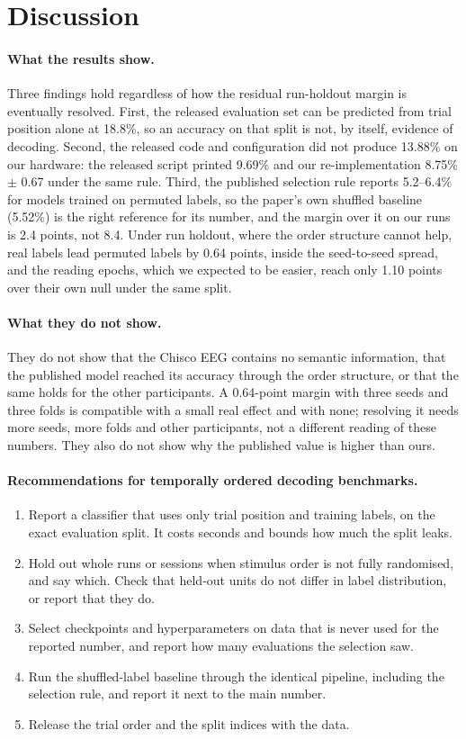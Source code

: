 \section{Discussion}
\label{sec:discussion}

\paragraph{What the results show.}
Three findings hold regardless of how the residual run-holdout margin is eventually resolved.
First, the released evaluation set can be predicted from trial position alone at 18.8\%, so an
accuracy on that split is not, by itself, evidence of decoding. Second, the released
code and configuration did not produce 13.88\% on our hardware: the released script printed 9.69\%
and our re-implementation 8.75\% $\pm$ 0.67 under the same rule. Third, the published selection rule
reports 5.2--6.4\% for models trained on permuted labels, so the paper's own shuffled baseline
(5.52\%) is the right reference for its number, and the margin over it on our runs is 2.4 points,
not 8.4. Under run holdout, where the order structure cannot help, real labels lead permuted labels
by 0.64 points, inside the seed-to-seed spread, and the reading epochs, which we expected to be
easier, reach only 1.10 points over their own null under the same split.

\paragraph{What they do not show.}
They do not show that the Chisco EEG contains no semantic information, that the published model
reached its accuracy through the order structure, or that the same holds for the other participants.
A 0.64-point margin with three seeds and three folds is compatible with a small real effect and with
none; resolving it needs more seeds, more folds and other participants, not a different reading of
these numbers. They also do not show why the published value is higher than ours.

\paragraph{Recommendations for temporally ordered decoding benchmarks.}
\begin{enumerate}
\item Report a classifier that uses only trial position and training labels, on the exact
evaluation split. It costs seconds and bounds how much the split leaks.
\item Hold out whole runs or sessions when stimulus order is not fully randomised, and say which.
Check that held-out units do not differ in label distribution, or report that they do.
\item Select checkpoints and hyperparameters on data that is never used for the reported number,
and report how many evaluations the selection saw.
\item Run the shuffled-label baseline through the identical pipeline, including the selection rule,
and report it next to the main number.
\item Release the trial order and the split indices with the data.
\end{enumerate}
